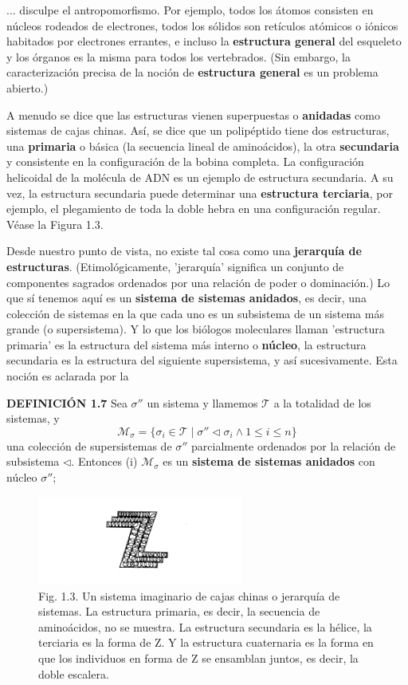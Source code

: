 {\fontsize{13}{15}\selectfont
... disculpe el antropomorfismo. Por ejemplo, todos los átomos consisten en núcleos rodeados de electrones, todos los sólidos son retículos atómicos o iónicos habitados por electrones errantes, e incluso la \textbf{estructura general} del esqueleto y los órganos es la misma para todos los vertebrados. (Sin embargo, la caracterización precisa de la noción de \textbf{estructura general} es un problema abierto.)

A menudo se dice que las estructuras vienen superpuestas o \textbf{anidadas} como sistemas de cajas chinas. Así, se dice que un polipéptido tiene dos estructuras, una \textbf{primaria} o básica (la secuencia lineal de aminoácidos), la otra \textbf{secundaria} y consistente en la configuración de la bobina completa. La configuración helicoidal de la molécula de ADN es un ejemplo de estructura secundaria. A su vez, la estructura secundaria puede determinar una \textbf{estructura terciaria}, por ejemplo, el plegamiento de toda la doble hebra en una configuración regular. Véase la Figura 1.3.

Desde nuestro punto de vista, no existe tal cosa como una \textbf{jerarquía de estructuras}. (Etimológicamente, 'jerarquía' significa un conjunto de componentes sagrados ordenados por una relación de poder o dominación.) Lo que sí tenemos aquí es un \textbf{sistema de sistemas anidados}, es decir, una colección de sistemas en la que cada uno es un subsistema de un sistema más grande (o supersistema). Y lo que los biólogos moleculares llaman 'estructura primaria' es la estructura del sistema más interno o \textbf{núcleo}, la estructura secundaria es la estructura del siguiente supersistema, y así sucesivamente. Esta noción es aclarada por la

\textbf{DEFINICIÓN 1.7} Sea $\sigma''$ un sistema y llamemos $\mathcal{T}$ a la totalidad de los sistemas, y
$$ \mathcal{M}_{\sigma} = \{\sigma_i \in \mathcal{T} \mid \sigma'' \triangleleft \sigma_i \land 1 \le i \le n\} $$
una colección de supersistemas de $\sigma''$ parcialmente ordenados por la relación de subsistema $\triangleleft$. Entonces
(i) $\mathcal{M}_{\sigma}$ es un \textbf{sistema de sistemas anidados} con núcleo $\sigma''$;

\begin{figure}[h!]
    \centering
    \includegraphics[width=0.6\textwidth]{imagenes/figura1.3.png}
    \caption*{Fig. 1.3. Un sistema imaginario de cajas chinas o jerarquía de sistemas. La estructura primaria, es decir, la secuencia de aminoácidos, no se muestra. La estructura secundaria es la hélice, la terciaria es la forma de Z. Y la estructura cuaternaria es la forma en que los individuos en forma de Z se ensamblan juntos, es decir, la doble escalera.}
\end{figure}
}

